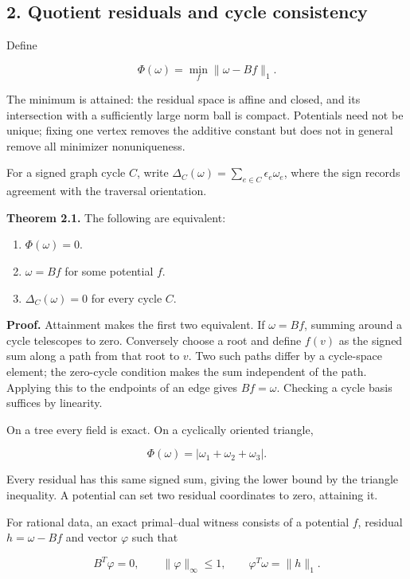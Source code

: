 \documentclass[
]{article}
\providecommand{\tightlist}{%
  \setlength{\itemsep}{0pt}\setlength{\parskip}{0pt}}
\begin{document}
\subsection{2. Quotient residuals and cycle
consistency}\label{quotient-residuals-and-cycle-consistency}

Define

\[
\Phi(\omega)=\min_f\|\omega-Bf\|_1.
\]

The minimum is attained: the residual space is affine and closed, and
its intersection with a sufficiently large norm ball is compact.
Potentials need not be unique; fixing one vertex removes the additive
constant but does not in general remove all minimizer nonuniqueness.

For a signed graph cycle \(C\), write
\(\Delta_C(\omega)=\sum_{e\in C}\epsilon_e\omega_e\), where the sign
records agreement with the traversal orientation.

\textbf{Theorem 2.1.} The following are equivalent:

\begin{enumerate}
\def\labelenumi{\arabic{enumi}.}
\tightlist
\item
  \(\Phi(\omega)=0\).
\item
  \(\omega=Bf\) for some potential \(f\).
\item
  \(\Delta_C(\omega)=0\) for every cycle \(C\).
\end{enumerate}

\textbf{Proof.} Attainment makes the first two equivalent. If
\(\omega=Bf\), summing around a cycle telescopes to zero. Conversely
choose a root and define \(f(v)\) as the signed sum along a path from
that root to \(v\). Two such paths differ by a cycle-space element; the
zero-cycle condition makes the sum independent of the path. Applying
this to the endpoints of an edge gives \(Bf=\omega\). Checking a cycle
basis suffices by linearity.

On a tree every field is exact. On a cyclically oriented triangle,

\[
\Phi(\omega)=|\omega_1+\omega_2+\omega_3|.
\]

Every residual has this same signed sum, giving the lower bound by the
triangle inequality. A potential can set two residual coordinates to
zero, attaining it.

For rational data, an exact primal--dual witness consists of a potential
\(f\), residual \(h=\omega-Bf\) and vector \(\varphi\) such that

\[
B^T\varphi=0,\qquad \|\varphi\|_\infty\le1,\qquad
\varphi^T\omega=\|h\|_1.
\]
\end{document}
